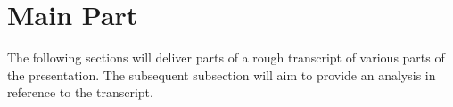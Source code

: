 \chapter{Main Part}

The following sections will deliver parts of a rough transcript of various parts of the presentation.
The subsequent subsection will aim to provide an analysis in reference to the transcript.




